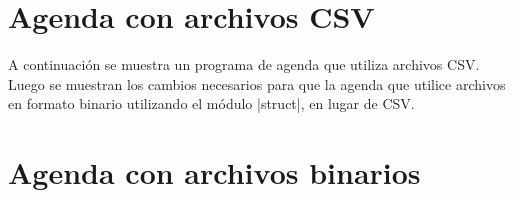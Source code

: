 \newpage
\begin{subappendices}
\section{Agenda con archivos CSV}

A continuación se muestra un programa de agenda que utiliza archivos
CSV\@. Luego se muestran los cambios necesarios para que la agenda que utilice archivos
en formato binario utilizando el módulo |struct|, en lugar de CSV.



\section{Agenda con archivos binarios}



\end{subappendices}
